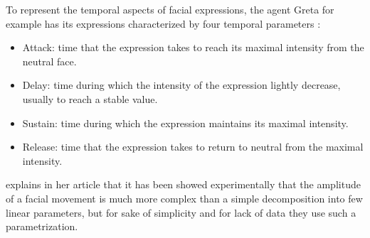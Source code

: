 \documentclass[11pt]{article}
\begin{document}
To represent the temporal aspects of facial expressions, the agent Greta for example has its expressions characterized by four temporal parameters \citep{Pelachaud05}:
\begin{itemize}
\item Attack: time that the expression takes to reach its maximal intensity from the neutral face.
\item Delay: time during which the intensity of the expression lightly decrease, usually to reach a stable value.
\item Sustain: time during which the expression maintains its maximal intensity.
\item Release: time that the expression takes to return to neutral from the maximal intensity.
\end{itemize}
\citeauthor{Pelachaud05} explains in her article that it has been showed experimentally that the amplitude of a facial movement is much more complex than a simple decomposition into few linear parameters, but for sake of simplicity and for lack of data they use such a parametrization.
\end{document}
